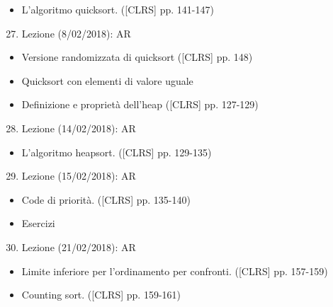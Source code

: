 \documentclass{article}
\providecommand{\tightlist}{%
  \setlength{\itemsep}{0pt}\setlength{\parskip}{0pt}}
\begin{document}
\begin{itemize}
\tightlist
\item
  {L'algoritmo quicksort. ({[}CLRS{]} pp. 141-147)}
\end{itemize}

\begin{enumerate}
\setcounter{enumi}{26}
\tightlist
\item
  {Lezione (8/02/2018): AR}
\end{enumerate}

\begin{itemize}
\tightlist
\item
  {Versione randomizzata di quicksort ({[}CLRS{]} pp. 148)}
\item
  {Quicksort con elementi di valore uguale}
\item
  {Definizione e proprietà dell'heap ({[}CLRS{]} pp. 127-129)}
\end{itemize}

\begin{enumerate}
\setcounter{enumi}{27}
\tightlist
\item
  {Lezione (14/02/2018): AR}
\end{enumerate}

\begin{itemize}
\tightlist
\item
  {L'algoritmo heapsort. ({[}CLRS{]} pp. 129-135)}
\end{itemize}

\begin{enumerate}
\setcounter{enumi}{28}
\tightlist
\item
  {Lezione (15/02/2018): AR}
\end{enumerate}

\begin{itemize}
\tightlist
\item
  {Code di priorità. ({[}CLRS{]} pp. 135-140)}
\item
  {Esercizi}
\end{itemize}

\begin{enumerate}
\setcounter{enumi}{29}
\tightlist
\item
  {Lezione (21/02/2018): AR}
\end{enumerate}

\begin{itemize}
\tightlist
\item
  {Limite inferiore per l'ordinamento per confronti. ({[}CLRS{]} pp.
  157-159)}
\item
  {Counting sort. ({[}CLRS{]} pp. 159-161)}
\end{itemize}
\end{document}
